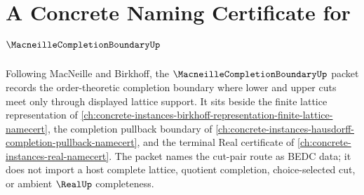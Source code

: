 \chapter{A Concrete Naming Certificate for $\MacneilleCompletionBoundaryUp$}
\label{ch:concrete-instances-macneille-completion-boundary-namecert}

Following MacNeille and Birkhoff, the $\MacneilleCompletionBoundaryUp$ packet records the order-theoretic completion boundary where lower and upper cuts meet only through displayed lattice support. It sits beside the finite lattice representation of \autoref{ch:concrete-instances-birkhoff-representation-finite-lattice-namecert}, the completion pullback boundary of \autoref{ch:concrete-instances-hausdorff-completion-pullback-namecert}, and the terminal Real certificate of \autoref{ch:concrete-instances-real-namecert}. The packet names the cut-pair route as BEDC data; it does not import a host complete lattice, quotient completion, choice-selected cut, or ambient $\RealUp$ completeness.


